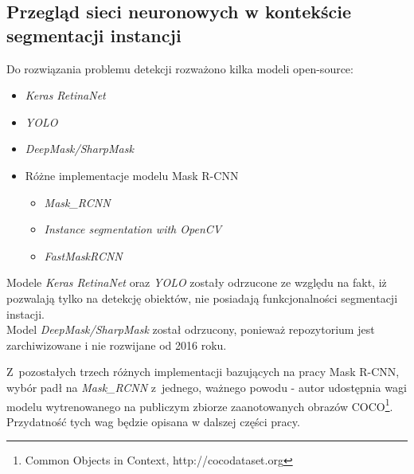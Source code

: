 \subsection{Przegląd sieci neuronowych w kontekście segmentacji instancji}

Do rozwiązania problemu detekcji rozważono kilka modeli open-source:

\begin{itemize}
	\item \textit{Keras RetinaNet} \cite{keras-retinanet}
	\item \textit{YOLO} \cite{yolo}
	\item \textit{DeepMask/SharpMask} \cite{deep-sharp-mask}
	\item Różne implementacje modelu Mask R-CNN \cite{general-mask-rcnn}
		\begin{itemize}
			\item \textit{Mask\_RCNN} \cite{matterport-mask-rcnn}
			\item \textit{Instance segmentation with OpenCV} \cite{mask-rcnn-opencv}
			\item \textit{FastMaskRCNN} \cite{fast-mask-rcnn}
		\end{itemize}
\end{itemize}

Modele \textit{Keras RetinaNet} oraz \textit{YOLO} zostały odrzucone ze względu na fakt, iż pozwalają tylko na detekcję obiektów, nie posiadają funkcjonalności segmentacji instacji. \\

Model \textit{DeepMask/SharpMask} został odrzucony, ponieważ repozytorium jest zarchiwizowane i nie rozwijane od 2016 roku.

Z~pozostałych trzech różnych implementacji bazujących na pracy Mask R-CNN, wybór padł na \textit{Mask\_RCNN} z~jednego, ważnego powodu - autor udostępnia wagi modelu wytrenowanego na publiczym zbiorze zaanotowanych obrazów COCO\footnote{Common Objects in Context, http://cocodataset.org}.
Przydatność tych wag będzie opisana w dalszej części pracy.
